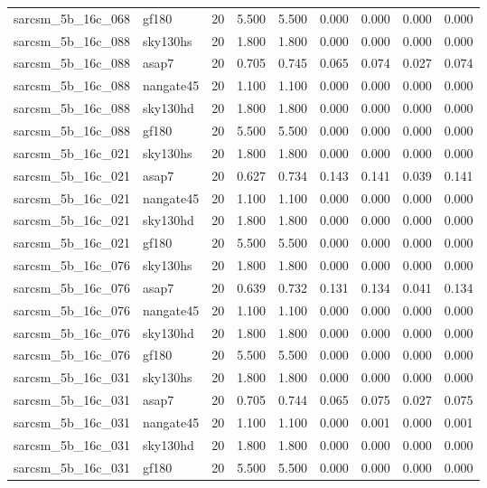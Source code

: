 \begin{tabular}{llrrrrrrr}
sarcsm\_5b\_16c\_068 & gf180 & 20 & 5.500 & 5.500 & 0.000 & 0.000 & 0.000 & 0.000 \\
sarcsm\_5b\_16c\_088 & sky130hs & 20 & 1.800 & 1.800 & 0.000 & 0.000 & 0.000 & 0.000 \\
sarcsm\_5b\_16c\_088 & asap7 & 20 & 0.705 & 0.745 & 0.065 & 0.074 & 0.027 & 0.074 \\
sarcsm\_5b\_16c\_088 & nangate45 & 20 & 1.100 & 1.100 & 0.000 & 0.000 & 0.000 & 0.000 \\
sarcsm\_5b\_16c\_088 & sky130hd & 20 & 1.800 & 1.800 & 0.000 & 0.000 & 0.000 & 0.000 \\
sarcsm\_5b\_16c\_088 & gf180 & 20 & 5.500 & 5.500 & 0.000 & 0.000 & 0.000 & 0.000 \\
sarcsm\_5b\_16c\_021 & sky130hs & 20 & 1.800 & 1.800 & 0.000 & 0.000 & 0.000 & 0.000 \\
sarcsm\_5b\_16c\_021 & asap7 & 20 & 0.627 & 0.734 & 0.143 & 0.141 & 0.039 & 0.141 \\
sarcsm\_5b\_16c\_021 & nangate45 & 20 & 1.100 & 1.100 & 0.000 & 0.000 & 0.000 & 0.000 \\
sarcsm\_5b\_16c\_021 & sky130hd & 20 & 1.800 & 1.800 & 0.000 & 0.000 & 0.000 & 0.000 \\
sarcsm\_5b\_16c\_021 & gf180 & 20 & 5.500 & 5.500 & 0.000 & 0.000 & 0.000 & 0.000 \\
sarcsm\_5b\_16c\_076 & sky130hs & 20 & 1.800 & 1.800 & 0.000 & 0.000 & 0.000 & 0.000 \\
sarcsm\_5b\_16c\_076 & asap7 & 20 & 0.639 & 0.732 & 0.131 & 0.134 & 0.041 & 0.134 \\
sarcsm\_5b\_16c\_076 & nangate45 & 20 & 1.100 & 1.100 & 0.000 & 0.000 & 0.000 & 0.000 \\
sarcsm\_5b\_16c\_076 & sky130hd & 20 & 1.800 & 1.800 & 0.000 & 0.000 & 0.000 & 0.000 \\
sarcsm\_5b\_16c\_076 & gf180 & 20 & 5.500 & 5.500 & 0.000 & 0.000 & 0.000 & 0.000 \\
sarcsm\_5b\_16c\_031 & sky130hs & 20 & 1.800 & 1.800 & 0.000 & 0.000 & 0.000 & 0.000 \\
sarcsm\_5b\_16c\_031 & asap7 & 20 & 0.705 & 0.744 & 0.065 & 0.075 & 0.027 & 0.075 \\
sarcsm\_5b\_16c\_031 & nangate45 & 20 & 1.100 & 1.100 & 0.000 & 0.001 & 0.000 & 0.001 \\
sarcsm\_5b\_16c\_031 & sky130hd & 20 & 1.800 & 1.800 & 0.000 & 0.000 & 0.000 & 0.000 \\
sarcsm\_5b\_16c\_031 & gf180 & 20 & 5.500 & 5.500 & 0.000 & 0.000 & 0.000 & 0.000 \\

\end{tabular}
